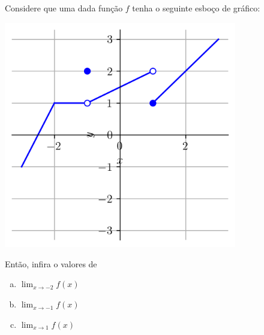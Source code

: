 \begin{exeresol}
  Considere que uma dada função $f$ tenha o seguinte esboço de gráfico:

  \begin{center}
    \includegraphics[width=4in]{./cap_lim/dados/fig_exeresol_nocaolim/fig.png}
  \end{center}

  Então, infira o valores de
  \begin{enumerate}[a)]
  \item $\displaystyle \lim_{x\to -2} f(x)$
  \item $\displaystyle \lim_{x\to -1} f(x)$
  \item $\displaystyle \lim_{x\to 1} f(x)$
  \end{enumerate}
\end{exeresol}
